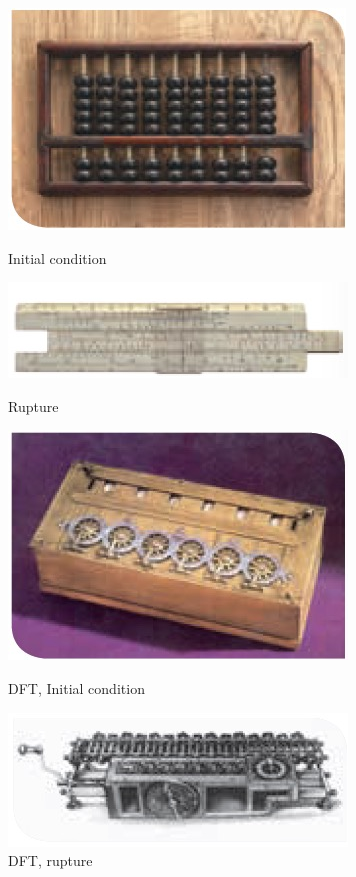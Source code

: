\documentclass[11pt]{book}
\begin{document}
\begin{figure}[ht]
  \label{fig7}
  \begin{minipage}[b]{0.5\linewidth}
    \centering
    \includegraphics[width=.5\linewidth]{./Images/abaco.jpg}
    \caption{Initial condition}
    \vspace{4ex}
  \end{minipage}%
  \begin{minipage}[b]{0.5\linewidth}
    \centering
    \includegraphics[width=.5\linewidth]{./Images/regla_calculo.jpg}
    \caption{Rupture}
    \vspace{4ex}
  \end{minipage}
  \begin{minipage}[b]{0.5\linewidth}
    \centering
    \includegraphics[width=.5\linewidth]{./Images/pascalina.jpg}
    \caption{DFT, Initial condition}
    \vspace{4ex}
  \end{minipage}%
  \begin{minipage}[b]{0.5\linewidth}
    \centering
    \includegraphics[width=.5\linewidth]{./Images/maquina_Leibniz.jpg}
    \caption{DFT, rupture}
    \vspace{4ex}
  \end{minipage}
\end{figure}
\end{document}
